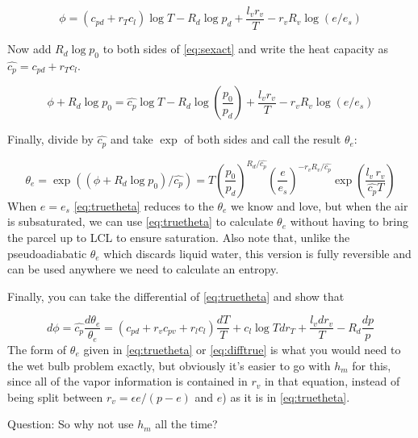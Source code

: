 \documentclass[12pt]{article}
\begin{document}
\begin{equation}
  \label{eq:sexact}
  \phi = (c_{pd} + r_T c_l) \log T - R_d \log p_d + \frac{l_v r_v}{T} - r_v R_v \log (e/e_s)
\end{equation}


Now add $R_d \log p_0$ to both sides of \eqref{eq:sexact} and write the
heat capacity as $\widehat{c_p} = c_{pd} + r_T c_l$.

\begin{equation}
  \label{eq:sexact2}
  \phi + R_d \log{p_0}= 
\widehat{c_p} \log T - R_d \log \left ( \frac{p_0}{p_d} \right )  
+ \frac{l_v r_v}{T} - r_v R_v \log (e/e_s)
\end{equation}


Finally, divide by $\widehat{c_p}$  and take $\exp$ of both sides and call the result $\theta_e$:

\begin{equation}
  \label{eq:truetheta}
 \theta_e = \exp \left ( \left ( \phi + R_d \log{p_0} \right )/ \widehat{c_p} \right  ) =
T \left ( \frac{p_0}{p_d} \right )^{R_d/\widehat{c_p}}
\left ( \frac{e}{e_s} \right )^{-r_v R_v/\widehat{c_p}}
\exp \left ( \frac{l_v\,r_v}{\widehat{c_p} T} \right )
\end{equation}
When $e=e_s$ \eqref{eq:truetheta} reduces to the $\theta_e$ we know and love, but
when the air is subsaturated, we can use \eqref{eq:truetheta} to calculate $\theta_e$
without having to bring the parcel up to LCL to ensure saturation.  Also note that,
unlike the pseudoadiabatic $\theta_e$ which discards liquid water, this version
is fully reversible and can be used anywhere we need to calculate an entropy.

Finally, you can take the differential of \eqref{eq:truetheta} and show that

\begin{equation}
  \label{eq:difftrue}
d\phi = \widehat{c_p} \frac{d \theta_e}{\theta_e}  = (c_{pd} + r_v c_{pv} +r_l c_l)
\frac{dT}{T} +c_l \log T d r_T + \frac{l_v d r_v}{T} - R_d \frac{dp}{p} 
\end{equation}
The form of $\theta_e$ given in \eqref{eq:truetheta} or \eqref{eq:difftrue}
is what you would need to the wet bulb problem exactly, but obviously
it's easier to go with $h_m$ for this, since all of the vapor information
is contained in $r_v$ in that equation, instead of being split
between $r_v= \epsilon e/(p-e)$ and $e$) as it is in \eqref{eq:truetheta}.

Question:  So why not use $h_m$ all the time?
\end{document}
